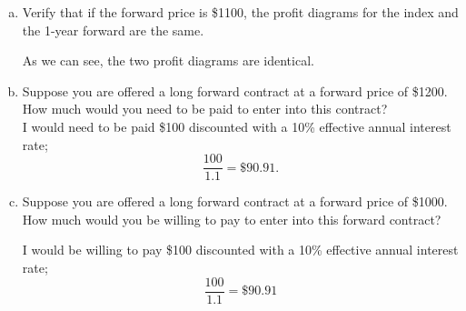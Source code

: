 \documentclass[12pt]{article}
\theoremstyle{plain}
\begin{document}
\begin{enumerate}[(a)]
\item Verify that if the forward price is \$1100, the profit diagrams for the index and the 1-year forward are the same.

\begin{center}
\end{center}
As we can see, the two profit diagrams are identical.

\item Suppose you are offered a long forward contract at a forward price of \$1200. How much would you need to be paid to enter into this contract?\\

I would need to be paid \$100 discounted with a 10\% effective annual interest rate;
\[
\frac{100}{1.1} = \$90.91.
\]

\item Suppose you are offered a long forward contract at a forward price of \$1000. How much would you be willing to pay to enter into this forward contract?

I would be willing to pay \$100 discounted with a 10\% effective annual interest rate;
\[
\frac{100}{1.1} = \$90.91
\]
\end{enumerate}
\end{document}
